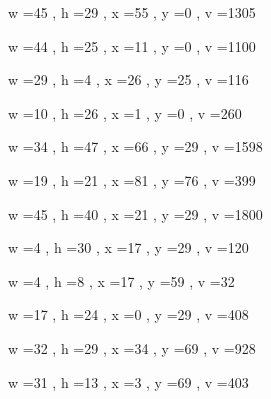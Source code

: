 \documentclass[11pt]{article}
\begin{document}
w =45 , h =29 , x =55 , y =0 , v =1305
\par
w =44 , h =25 , x =11 , y =0 , v =1100
\par
w =29 , h =4 , x =26 , y =25 , v =116
\par
w =10 , h =26 , x =1 , y =0 , v =260
\par
w =34 , h =47 , x =66 , y =29 , v =1598
\par
w =19 , h =21 , x =81 , y =76 , v =399
\par
w =45 , h =40 , x =21 , y =29 , v =1800
\par
w =4 , h =30 , x =17 , y =29 , v =120
\par
w =4 , h =8 , x =17 , y =59 , v =32
\par
w =17 , h =24 , x =0 , y =29 , v =408
\par
w =32 , h =29 , x =34 , y =69 , v =928
\par
w =31 , h =13 , x =3 , y =69 , v =403
\par
\newpage
\end{document}
